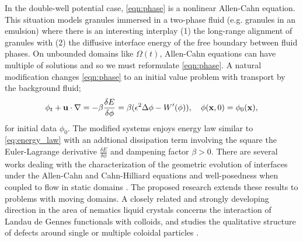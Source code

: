 In the double-well potential case, \eqref{eqn:phase}
is a nonlinear Allen-Cahn
equation.
This situation models granules immersed in a two-phase fluid
(e.g. granules in an emulsion) 
where there is an interesting interplay
(1) the long-range alignment of granules with (2) 
the diffusive interface energy of the free boundary
between fluid phases.
On unbounded domains like $\Omega(t)$,
Allen-Cahn equations can have multiple of solutions
\cite{Alama1997StationaryLS,Alikakos2008OnAE,Bronsard1993OnTB,
  Byeon2014SolutionsOH, Byeon2013OnAP, Alessio2005ENTIRESI,
  Trumper2007ExistenceOA,Benci2019MultipleSF}
and so we must reformulate
\eqref{eqn:phase}.
A natural modification changes
\eqref{eqn:phase} to an initial value problem with
transport by the background fluid;
\begin{equation}
  \label{eqn:phase_transport}
  \phi_t + \mathbf{u} \cdot \nabla
  = -\beta \frac{\delta E}{\delta \phi}
  =  \beta(\epsilon^2 \Delta \phi - W'(\phi)),
  \quad \phi(\mathbf{x},0) = \phi_0(\mathbf{x}),
\end{equation}
for initial data $\phi_0$.
The modified systems enjoys energy law similar to \eqref{eq:energy_law} 
with an addtional dissipation term involving the square 
the Euler-Lagrange derivative $\frac{\delta E}{\delta \phi}$ and dampening factor $\beta > 0$.
There are several works dealing with the
characterization of the geometric evolution
of interfaces under the Allen-Cahn and Cahn-Hilliard equations
\cite{Christlieb2019CompetitionAC, Gavish2011CurvatureDF, Dai2019WeakSF,
  Promislow2017ExistenceBA, Dai2015CompetitiveGE, Promislow2012CriticalPO,
  Dai2022GeometricEO, Dai2020MinimizersFT,Dai2013GeometricEO,Promislow2022UndulatedBI} and
well-posedness when coupled to flow in static domains
\cite{Jiang2017TwophaseIF, Liu2012StrongSF, Giorgini2019WellPosednessOA,
Wu2022WellposednessOA, Gal2010AsymptoticBO,
Giorgini2020DiffuseIM,Giorgini2019UniquenessAR}.
The proposed research extends these results to
problems with moving domains.
A closely related and strongly developing direction in
the area of nematics liquid crystals concerns the interaction of
Landau de Gennes functionals with colloids, and studies
the qualitative structure of defects around single or multiple
coloidal particles
\cite{doi:10.1098/rsta.2020.0432, Alama2015MinimizersOT, Alama2021SaturnRD, PhysRevE.96.042702}.

